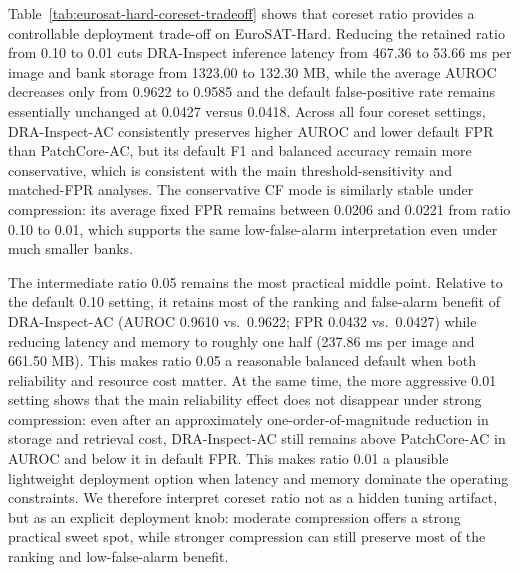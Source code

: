 \documentclass[remotesensing,article,submit,pdftex,moreauthors]{Definitions/mdpi}
\begin{document}
\noindent Table~\ref{tab:eurosat-hard-coreset-tradeoff} shows that coreset ratio provides a controllable deployment trade-off on EuroSAT-Hard. Reducing the retained ratio from 0.10 to 0.01 cuts DRA-Inspect inference latency from 467.36 to 53.66 ms per image and bank storage from 1323.00 to 132.30 MB, while the average AUROC decreases only from 0.9622 to 0.9585 and the default false-positive rate remains essentially unchanged at 0.0427 versus 0.0418. Across all four coreset settings, DRA-Inspect-AC consistently preserves higher AUROC and lower default FPR than PatchCore-AC, but its default F1 and balanced accuracy remain more conservative, which is consistent with the main threshold-sensitivity and matched-FPR analyses. The conservative CF mode is similarly stable under compression: its average fixed FPR remains between 0.0206 and 0.0221 from ratio 0.10 to 0.01, which supports the same low-false-alarm interpretation even under much smaller banks.

\noindent The intermediate ratio 0.05 remains the most practical middle point. Relative to the default 0.10 setting, it retains most of the ranking and false-alarm benefit of DRA-Inspect-AC (AUROC 0.9610 vs.\ 0.9622; FPR 0.0432 vs.\ 0.0427) while reducing latency and memory to roughly one half (237.86 ms per image and 661.50 MB). This makes ratio 0.05 a reasonable balanced default when both reliability and resource cost matter. At the same time, the more aggressive 0.01 setting shows that the main reliability effect does not disappear under strong compression: even after an approximately one-order-of-magnitude reduction in storage and retrieval cost, DRA-Inspect-AC still remains above PatchCore-AC in AUROC and below it in default FPR. This makes ratio 0.01 a plausible lightweight deployment option when latency and memory dominate the operating constraints. We therefore interpret coreset ratio not as a hidden tuning artifact, but as an explicit deployment knob: moderate compression offers a strong practical sweet spot, while stronger compression can still preserve most of the ranking and low-false-alarm benefit.
\end{document}

